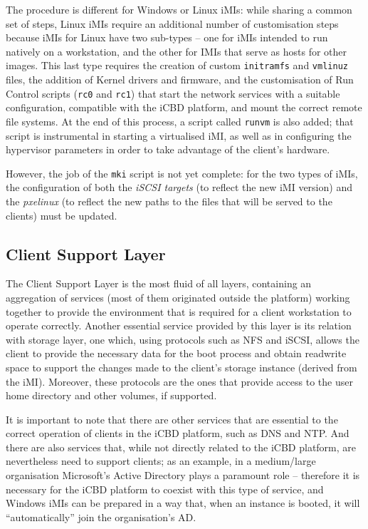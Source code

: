 The procedure is different for Windows or Linux iMIs: while sharing a common set of steps, Linux iMIs require an additional number of customisation steps because iMIs for Linux have two sub-types – one for iMIs intended to run natively on a workstation, and the other for IMIs that serve as hosts for other images. This last type requires the creation of custom \texttt{initramfs} and \texttt{vmlinuz} files, the addition of Kernel drivers and firmware, and the customisation of Run Control scripts (\texttt{rc0} and \texttt{rc1}) that start the network services with a suitable configuration, compatible with the iCBD platform, and mount the correct remote file systems. At the end of this process, a script called \texttt{runvm} is also added; that script is instrumental in starting a virtualised iMI, as well as in configuring the hypervisor parameters in order to take advantage of the client’s hardware.

However, the job of the \texttt{mki} script is not yet complete: for the two types of iMIs, the configuration of both the \textit{iSCSI targets} (to reflect the new iMI version) and the \textit{pxelinux} (to reflect the new paths to the files that will be served to the clients) must be updated.


\subsection{Client Support Layer}
\label{sub:icbd_client_support_layer}

The Client Support Layer is the most fluid of all layers, containing an aggregation of services (most of them originated outside the platform) working together to provide the environment that is required for a client workstation to operate correctly. Another essential service provided by this layer is its relation with storage layer, one which, using protocols such as NFS and iSCSI, allows the client to provide the necessary data for the boot process and obtain read\/write space to support the changes made to the client’s storage instance (derived from the iMI). Moreover, these protocols are the ones that provide access to the user home directory and other volumes, if supported.

It is important to note that there are other services that are essential to the correct operation of clients in the iCBD platform, such as DNS and NTP. And there are also services that, while not directly related to the iCBD platform, are nevertheless need to support clients; as an example, in a medium/large organisation Microsoft’s Active Directory plays a paramount role – therefore it is necessary for the iCBD platform to coexist with this type of service, and Windows iMIs can be prepared in a way that, when an instance is booted, it will “automatically” join the organisation’s AD.

